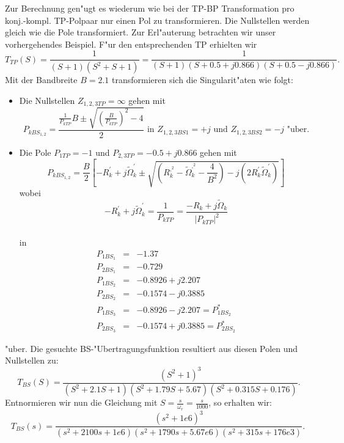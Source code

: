 \nit Zur Berechnung gen"ugt es wiederum wie bei der TP-BP Transformation
pro konj.-kompl. TP-Polpaar nur einen Pol zu transformieren.  Die
Nullstellen werden gleich wie die Pole transformiert.  Zur
Erl"auterung betrachten wir unser vorhergehendes Beispiel. F"ur den
entsprechenden TP erhielten wir
\[
T_{TP}(S)={\displaystyle \frac{1}{(S+1)(S^{2}+S+1)}=
\frac{1}{(S+1)(S+0.5+j0.866)(S+0.5-j0.866)}}.
\]
\nit Mit der Bandbreite $B=2.1$ transformieren sich die Singularit"aten wie folgt:
\begin{itemize}
\item Die Nullstellen $Z_{1,2,3TP}=\infty$ gehen mit
\begin{equation*}
P_{kBS_{1,2}}=\frac{\frac{1}{P_{kTP}}B \pm \sqrt{\left(\frac{B}
{P_{kTP}}\right)^{2}-4}}{2} \mbox{ in }Z_{1,2,3BS1}=+j\mbox{ und }Z_{1,2,3BS2}=-j\mbox{ "uber.}
\end{equation*}

\item Die Pole  $P_{1TP}=- 1$ und $P_{2,3TP}=- 0.5 + j 0.866$ gehen mit
\[
P_{kBS_{1,2}}=\frac{B}{2}\left[-R_{k}^{'}+j\tilde{\Omega}_{k}^{'} \pm
\sqrt{\left(R^{,^{2}}_{k}-\tilde{\Omega}_{k}^{,^{2}}-\frac{4}{B^{2}}\right)
-j(2R_{k}^{'}\tilde{\Omega}_{k}^{'})}\right]
\]
\nit wobei
\begin{equation}
-R_{k}^{'}+j\tilde{\Omega}_{k}^{'}=\frac{1}{P_{kTP}}=
\frac{-R_{k}+j\tilde{\Omega}_{k}}{|P_{kTP}|^{2}}
\end{equation}\\
\nit in
\begin{eqnarray*}
P_{1BS_{1}} &=& -1.37\\
P_{2BS_{1}} &=& -0.729\\
P_{1BS_{2}} &=& -0.8926+j2.207\\
P_{2BS_{2}} &=& -0.1574-j0.3885\\
P_{1BS_{3}} &=& -0.8926-j2.207=P_{1BS_{2}}^{*}\\
P_{2BS_{3}} &=& -0.1574+j0.3885=P_{2BS_{2}}^{*}
\end{eqnarray*}
\end{itemize}
\nit "uber.  Die gesuchte BS-"Ubertragungsfunktion resultiert aus diesen
Polen und Nullstellen zu:
\[
T_{BS}(S)=\frac{(S^{2}+1)^{3}}{(S^{2}+2.1S+1)(S^{2}+1.79S+5.67)
(S^{2}+0.315S+0.176)}.
\]
\nit Entnormieren wir nun die Gleichung mit $S=\frac{s}{\omega_r}=\frac{s}{1000}$, so erhalten wir:\\
\begin{equation}
T_{BS}(s)=\frac{(s^{2}+1e6)^{3}}{(s^{2}+2100s+1e6)(s^{2}+1790s+5.67e6)
(s^{2}+315s+176e3)}.~\label{FILT_RE_BS} 
\end{equation}
